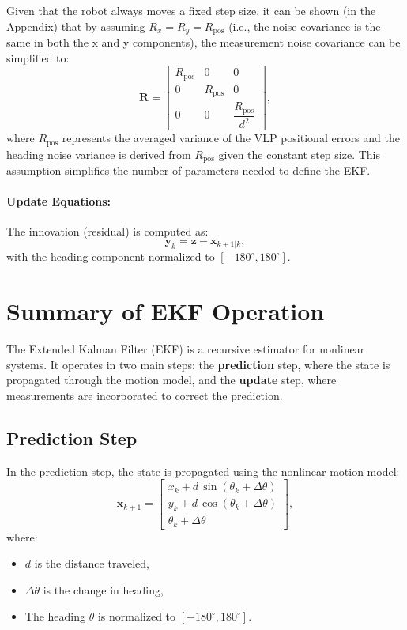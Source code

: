 Given that the robot always moves a fixed step size, it can be shown (in the Appendix) that by assuming \( R_x = R_y = R_{\text{pos}} \) (i.e., the noise covariance is the same in both the x and y components), the measurement noise covariance can be simplified to:
\[
\mathbf{R} =
\begin{bmatrix}
R_{\text{pos}} & 0 & 0 \\
0 & R_{\text{pos}}  & 0 \\
0 & 0 & \dfrac{R_{\text{pos}}}{d^2}
\end{bmatrix},
\]
where \(R_{\text{pos}}\) represents the averaged variance of the VLP positional errors and the heading noise variance is derived from \(R_{\text{pos}}\) given the constant step size. This assumption simplifies the number of parameters needed to define the EKF.

\paragraph{Update Equations:}  
The innovation (residual) is computed as:
\[
\bm{y}_k = \bm{z} - \bm{x}_{k+1|k},
\]
with the heading component normalized to \([-180^\circ, 180^\circ]\). 


\section*{Summary of EKF Operation}

The Extended Kalman Filter (EKF) is a recursive estimator for nonlinear systems. 
It operates in two main steps: the \textbf{prediction} step, where the state is propagated through the motion model, and the \textbf{update} step, where measurements are incorporated to correct the prediction.

\subsection*{Prediction Step}

In the prediction step, the state is propagated using the nonlinear motion model:
\[
\bm{x}_{k+1} =
\begin{bmatrix}
x_k + d\,\sin(\theta_k+\Delta\theta) \\
y_k + d\,\cos(\theta_k+\Delta\theta) \\
\theta_k+\Delta\theta
\end{bmatrix},
\]
\noindent where:
\begin{itemize}
    \item \(d\) is the distance traveled,
    \item \(\Delta\theta\) is the change in heading,
    \item The heading \(\theta\) is normalized to \([-180^\circ, 180^\circ]\).
\end{itemize}

